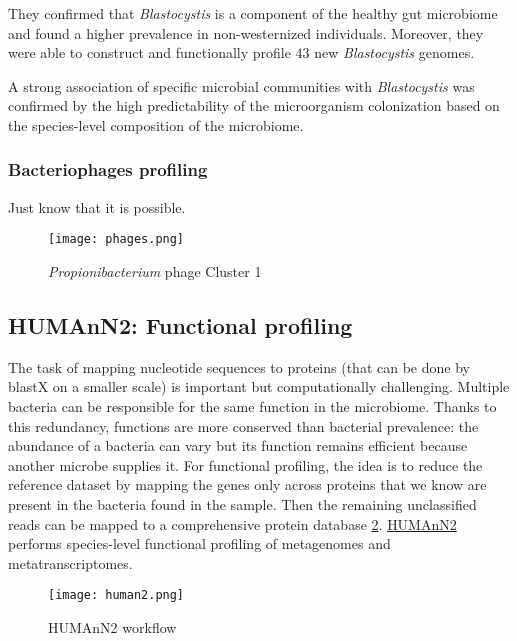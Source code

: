 They confirmed that \emph{Blastocystis} is a component of the healthy gut microbiome and found a higher prevalence in non-westernized individuals. Moreover, they were able to construct and functionally profile $43$ new \emph{Blastocystis} genomes.

A strong association of specific microbial communities with \emph{Blastocystis} was confirmed by the high predictability of the microorganism colonization based on the species-level composition of the microbiome.   

\subsubsection{Bacteriophages profiling}

Just know that it is possible.

\begin{figure}[!h]
\centering
\texttt{[image: phages.png]}
\caption{\label{fig:phages}\emph{Propionibacterium} phage Cluster 1}
\end{figure}

\subsection{HUMAnN2: Functional profiling}

The task of mapping nucleotide sequences to proteins (that can be done by blastX on a smaller scale) is important but computationally challenging. 
Multiple bacteria can be responsible for the same function in the microbiome. Thanks to this redundancy, functions are more conserved than bacterial prevalence: the abundance of a bacteria can vary but its function remains efficient because another microbe supplies it.
For functional profiling, the idea is to reduce the reference dataset by mapping the genes only across proteins that we know are present in the bacteria found in the sample. Then the remaining unclassified reads can be mapped to a comprehensive protein database \ref{fig:human2}.
\href{https://www.nature.com/articles/s41592-018-0176-y}{HUMAnN2} performs species-level functional profiling of metagenomes and metatranscriptomes.

\begin{figure}[!h]
\centering
\texttt{[image: human2.png]}
\caption{\label{fig:human2}HUMAnN2 workflow}
\end{figure}
